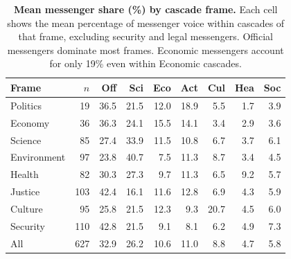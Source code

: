 \begin{table}[h]
\centering
\renewcommand{\arraystretch}{1.15}
\caption{\textbf{Mean messenger share (\%) by cascade frame.}
Each cell shows the mean percentage of messenger voice within
cascades of that frame, excluding security and legal messengers.
Official messengers dominate most frames. Economic messengers
account for only 19\% even within Economic cascades.}
\label{tab:si_messenger_share}
\vspace{0.3em}
\footnotesize
\begin{tabular}{@{}l r r r r r r r r @{}}
\toprule
Frame & $n$ & Off & Sci & Eco & Act & Cul & Hea & Soc \\
\midrule
Politics & 19 & 36.5 & 21.5 & 12.0 & 18.9 & 5.5 & 1.7 & 3.9 \\
Economy & 36 & 36.3 & 24.1 & 15.5 & 14.1 & 3.4 & 2.9 & 3.6 \\
Science & 85 & 27.4 & 33.9 & 11.5 & 10.8 & 6.7 & 3.7 & 6.1 \\
Environment & 97 & 23.8 & 40.7 & 7.5 & 11.3 & 8.7 & 3.4 & 4.5 \\
Health & 82 & 30.3 & 27.3 & 9.7 & 11.3 & 6.5 & 9.2 & 5.7 \\
Justice & 103 & 42.4 & 16.1 & 11.6 & 12.8 & 6.9 & 4.3 & 5.9 \\
Culture & 95 & 25.8 & 21.5 & 12.3 & 9.3 & 20.7 & 4.5 & 6.0 \\
Security & 110 & 42.8 & 21.5 & 9.1 & 8.1 & 6.2 & 4.9 & 7.3 \\
\midrule
All & 627 & 32.9 & 26.2 & 10.6 & 11.0 & 8.8 & 4.7 & 5.8 \\
\bottomrule
\end{tabular}
\end{table}